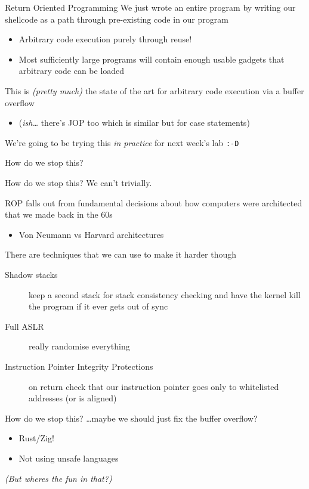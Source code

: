 \documentclass[9pt,aspectratio=169]{beamer}
\begin{document}
\begin{frame}[label={sec:org3b58f29},fragile]{Return Oriented Programming}
 We just wrote an entire program by writing our shellcode as a path through pre-existing code in our program
\begin{itemize}
\item Arbitrary code execution purely through reuse!
\item Most sufficiently large programs will contain enough usable gadgets that arbitrary code can be loaded
\end{itemize}

This is \emph{(pretty much)} the state of the art for arbitrary code execution via a buffer overflow
\begin{itemize}
\item (\emph{ish\ldots{}} there's JOP too which is similar but for case statements)
\end{itemize}

We're going to be trying this \emph{in practice} for next week's lab \texttt{:-D}
\end{frame}
\begin{frame}[label={sec:org0af9d2e}]{How do we stop this?}
\end{frame}
\begin{frame}[label={sec:orgf25b715}]{How do we stop this?}
We can't trivially.

ROP falls out from fundamental decisions about how computers were architected that we made back in the 60s
\begin{itemize}
\item Von Neumann vs Harvard architectures
\end{itemize}

There are techniques that we can use to make it harder though
\begin{description}
\item[{Shadow stacks}] keep a second stack for stack consistency checking and have the kernel kill the program if it ever gets out of sync
\item[{Full ASLR}] really randomise everything
\item[{Instruction Pointer Integrity Protections}] on return check that our instruction pointer goes only to whitelisted addresses (or is aligned)
\end{description}
\end{frame}
\begin{frame}[label={sec:org49a9d42}]{How do we stop this?}
\ldots{}maybe we should just fix the buffer overflow?
\begin{itemize}
\item Rust/Zig!
\item Not using unsafe languages

\vfill
\end{itemize}
\emph{(But wheres the fun in that?)}
\end{frame}
\end{document}
